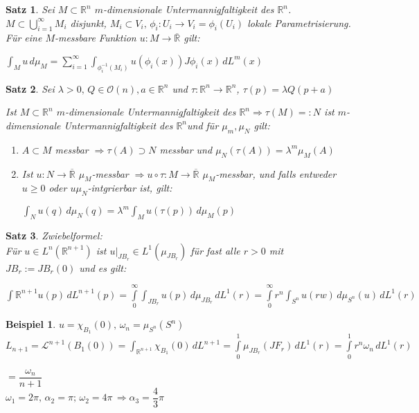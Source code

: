\documentclass[11pt]{memoir}
\theoremstyle{changebreak}
\newtheorem{Beispiel}{Beispiel}[chapter]
\newtheorem{Satz}{Satz}[chapter]
\newcommand{\umgf}{$m$-dimensionale Untermannigfaltigkeit des $\mathbb R^n$}
\begin{document}
\begin{Satz}
Sei $M \subset \mathbb R^n$ \umgf. $M \subset \bigcup\limits_{i=1}^\infty M_i$ disjunkt, $M_i \subset V_i, \, \phi_i: U_i \rightarrow V_i = \phi_i(U_i)$ lokale Parametrisierung. Für eine $M$-messbare Funktion $u: M \rightarrow \overline{\mathbb R}$ gilt:
\begin{center}
	$\int_M u \, d\mu_M = \sum\limits_{i=1}^\infty \int_{\phi_i^{-1}(M_i)} u(\phi_i(x))J\phi_i(x) \, dL^m(x)$
\end{center}
\end{Satz}

\begin{Satz}
Sei $\lambda > 0, \, Q \in \mathscr O(n), a \in \mathbb R^n$ und $\tau: \mathbb R^n \rightarrow \mathbb R^n$, $\tau(p) = \lambda Q(p+a)$ 
\par
Ist $M \subset \mathbb R^n$ \umgf $\Rightarrow \tau(M) =: N$ ist \umgf und für $\mu_m, \mu_N$ gilt:
\begin{enumerate}
	\item $A \subset M$ messbar $\Rightarrow \tau(A) \supset N$ messbar und $\mu_N (\tau(A)) = \lambda^m \mu_M (A)$
	\item Ist $u: N \rightarrow \overline{\mathbb R}$ $\mu_M$-messbar $\Rightarrow u \circ \tau: M \rightarrow \overline{\mathbb R}$ $\mu_M$-messbar, und falls entweder $u \geq 0$ oder $u \mu_N$-intgrierbar ist, gilt:
	\begin{center}
		$\int_N u(q) \,d\mu_N(q) = \lambda^m \int_M u(\tau(p))\, d\mu_M(p)$
	\end{center}
\end{enumerate}
\end{Satz}

\begin{Satz}
\emph{Zwiebelformel}: \\
Für $u \in L^n(\mathbb R^{n+1})$ ist $u\lvert_{JB_r} \in L^1(\mu_{JB_r})$ für fast alle $r >0$ mit $JB_r:= JB_r(0)$ und es gilt:
\begin{center}
	$\int{\mathbb R^{n+1}} u(p) \, dL^{n+1}(p) = \int\limits_0^\infty \int_{JB_r} u(p) \,d\mu_{JB_r} \,dL^1(r) = \int\limits_0^\infty r^n \int_{S^n} u(rw)\,d\mu_{S^n}(u) \,dL^1(r)$
\end{center}
\end{Satz}

\begin{Beispiel}
$u = \chi_{B_1}(0),\, \omega_n = \mu_{S^n} (S^n) $\\
$L_{n+1} = \mathscr L^{n+1}(B_1(0)) = \int_{\mathbb R^{n+1}} \chi_{B_1}(0) \,dL^{n+1} = \int\limits_0^1 \mu_{JB_r}(JF_r) \,dL^1(r) = \int\limits_0^1 r^n \omega_n \, dL^1(r) $
\par
$= \dfrac{\omega_n}{n+1}$ \\
$\omega_1 = 2\pi, \, \alpha_2 = \pi; \, \omega_2 = 4\pi \, \Rightarrow \alpha_3 = \dfrac{4}{3}\pi$
\end{Beispiel}
\end{document}
